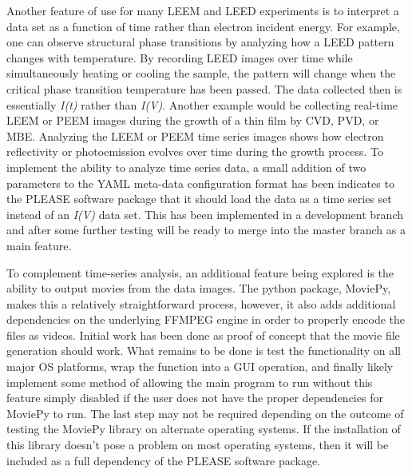 Another feature of use for many LEEM and LEED experiments is to interpret a data set as a function of time rather than electron incident energy. For example, one can observe structural phase transitions by analyzing how a LEED pattern changes with temperature. By recording LEED images over time while simultaneously heating or cooling the sample, the pattern will change when the critical phase transition temperature has been passed. The data collected then is essentially \textit{I(t)} rather than \textit{I(V)}. Another example would be collecting real-time LEEM or PEEM images during the growth of a thin film by CVD, PVD, or MBE. Analyzing the LEEM or PEEM time series images shows how electron reflectivity or photoemission evolves over time during the growth process. To implement the ability to analyze time series data, a small addition of two parameters to the YAML meta-data configuration format has been indicates to the PLEASE software package that it should load the data as a time series set instead of an \textit{I(V)} data set. This has been implemented in a development branch and after some further testing will be ready to merge into the master branch as a main feature.

To complement time-series analysis, an additional feature being explored is the ability to output movies from the data images. The python package, MoviePy, makes this a relatively straightforward process, however, it also adds additional dependencies on the underlying FFMPEG engine in order to properly encode the files as videos. Initial work has been done as proof of concept that the movie file generation should work. What remains to be done is test the functionality on all major OS platforms, wrap the function into a GUI operation, and finally likely implement some method of allowing the main program to run without this feature simply disabled if the user does not have the proper dependencies for MoviePy to run. The last step may not be required depending on the outcome of testing the MoviePy library on alternate operating systems. If the installation of this library doesn't pose a problem on most operating systems, then it will be included as a full dependency of the PLEASE software package.

